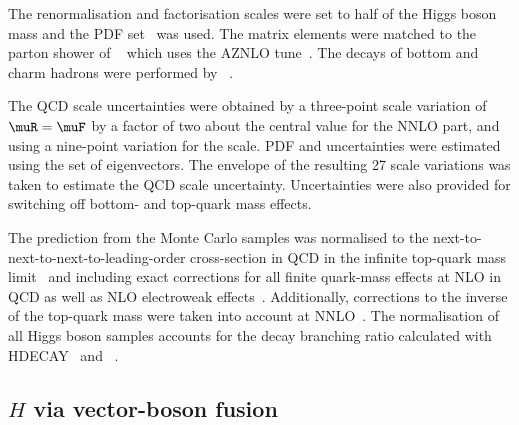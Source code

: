 The renormalisation and factorisation scales were set to half of the Higgs boson mass and the \PDFforLHC[15nnlo] PDF
set~\cite{Butterworth:2015oua} was used. The matrix elements were matched to the parton shower of \PYTHIA[8]~\cite{Sjostrand:2014zea}
which uses the AZNLO tune~\cite{STDM-2012-23}. The decays of bottom and charm hadrons
were performed by \EVTGEN~\cite{Lange:2001uf}.

The QCD scale uncertainties were obtained by a three-point scale variation of $\muR=\muF$ by a factor of two about 
the central value for the NNLO part, and using a nine-point variation for the \POWHEG scale. 
PDF and \alphas uncertainties were estimated using the \PDFforLHC[15nlo] set of eigenvectors.
The envelope of the resulting 27 scale variations was taken to estimate the QCD scale uncertainty. 
Uncertainties were also provided for switching off bottom- and top-quark mass effects.

The prediction from the Monte Carlo samples was normalised to the next-to-next-to-next-to-leading-order 
cross-section in QCD in the infinite top-quark mass 
limit~\cite{deFlorian:2016spz,Anastasiou:2016cez,Anastasiou:2015ema,Dulat:2018rbf,Aglietti:2004nj} and including exact 
corrections for all finite quark-mass effects at NLO in QCD as well as NLO electroweak 
effects~\cite{Actis:2008ug,Bonetti:2018ukf}. Additionally, corrections to the inverse of the top-quark mass were taken 
into account at NNLO~\cite{Harlander:2009mq,Harlander:2009bw,Harlander:2009my,Pak:2009dg}. 
The normalisation of all Higgs boson samples accounts for the decay branching ratio calculated with 
HDECAY~\cite{Djouadi:1997yw,Spira:1997dg,Djouadi:2006bz}
and \PROPHECY~\cite{Bredenstein:2006ha,Bredenstein:2006rh,Bredenstein:2006nk}.


\subsection{$H$ via vector-boson fusion}

